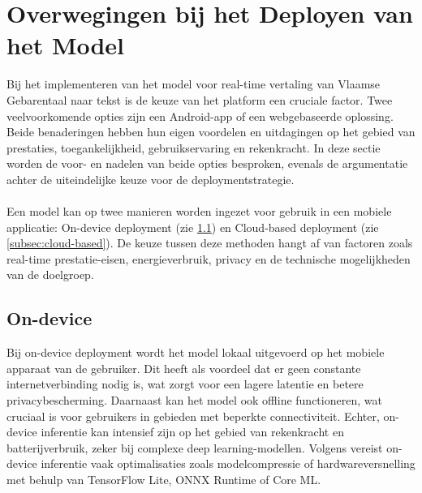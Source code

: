 \section{Overwegingen bij het Deployen van het Model}
Bij het implementeren van het model voor real-time vertaling van Vlaamse Gebarentaal naar tekst is de keuze van het platform een cruciale factor. 
Twee veelvoorkomende opties zijn een Android-app of een webgebaseerde oplossing. Beide benaderingen hebben hun eigen voordelen en uitdagingen op het gebied van prestaties, toegankelijkheid, gebruikservaring en rekenkracht. 
In deze sectie worden de voor- en nadelen van beide opties besproken, evenals de argumentatie achter de uiteindelijke keuze voor de deploymentstrategie.
\\
\\
Een model kan op twee manieren worden ingezet voor gebruik in een mobiele applicatie: On-device deployment (zie \ref{subsec:on-device}) en Cloud-based deployment (zie \ref{subsec:cloud-based}).
De keuze tussen deze methoden hangt af van factoren zoals real-time prestatie-eisen, energieverbruik, privacy en de technische mogelijkheden van de doelgroep.
\subsection{On-device}
\label{subsec:on-device}
Bij on-device deployment wordt het model lokaal uitgevoerd op het mobiele apparaat van de gebruiker. 
Dit heeft als voordeel dat er geen constante internetverbinding nodig is, wat zorgt voor een lagere latentie en betere privacybescherming. 
Daarnaast kan het model ook offline functioneren, wat cruciaal is voor gebruikers in gebieden met beperkte connectiviteit. 
Echter, on-device inferentie kan intensief zijn op het gebied van rekenkracht en batterijverbruik, zeker bij complexe deep learning-modellen. 
Volgens \textcite{8360327} vereist on-device inferentie vaak optimalisaties zoals modelcompressie of hardwareversnelling met behulp van TensorFlow Lite, ONNX Runtime of Core ML.

